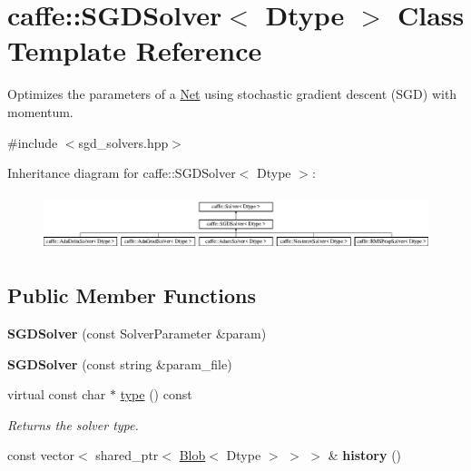 \hypertarget{classcaffe_1_1SGDSolver}{}\section{caffe\+:\+:S\+G\+D\+Solver$<$ Dtype $>$ Class Template Reference}
\label{classcaffe_1_1SGDSolver}


Optimizes the parameters of a \hyperlink{classcaffe_1_1Net}{Net} using stochastic gradient descent (S\+GD) with momentum.  




{\ttfamily \#include $<$sgd\+\_\+solvers.\+hpp$>$}

Inheritance diagram for caffe\+:\+:S\+G\+D\+Solver$<$ Dtype $>$\+:\begin{figure}[H]
\begin{center}
\leavevmode
\includegraphics[height=1.655172cm]{classcaffe_1_1SGDSolver}
\end{center}
\end{figure}
\subsection*{Public Member Functions}
\begin{DoxyCompactItemize}
\item 
{\bfseries S\+G\+D\+Solver} (const Solver\+Parameter \&param)\hypertarget{classcaffe_1_1SGDSolver_a144735c352c1eff4e3bb3f8f03c81d4b}{}\label{classcaffe_1_1SGDSolver_a144735c352c1eff4e3bb3f8f03c81d4b}

\item 
{\bfseries S\+G\+D\+Solver} (const string \&param\+\_\+file)\hypertarget{classcaffe_1_1SGDSolver_ac1b30549a2cddbbb1312b7fa10aca1c6}{}\label{classcaffe_1_1SGDSolver_ac1b30549a2cddbbb1312b7fa10aca1c6}

\item 
virtual const char $\ast$ \hyperlink{classcaffe_1_1SGDSolver_a6beb033f8b7325da0be58bb1fdde3ee6}{type} () const \hypertarget{classcaffe_1_1SGDSolver_a6beb033f8b7325da0be58bb1fdde3ee6}{}\label{classcaffe_1_1SGDSolver_a6beb033f8b7325da0be58bb1fdde3ee6}

\begin{DoxyCompactList}\small\item\em Returns the solver type. \end{DoxyCompactList}\item 
const vector$<$ shared\+\_\+ptr$<$ \hyperlink{classcaffe_1_1Blob}{Blob}$<$ Dtype $>$ $>$ $>$ \& {\bfseries history} ()\hypertarget{classcaffe_1_1SGDSolver_a1797885e164748e3eea2d93154661feb}{}\label{classcaffe_1_1SGDSolver_a1797885e164748e3eea2d93154661feb}

\end{DoxyCompactItemize}
